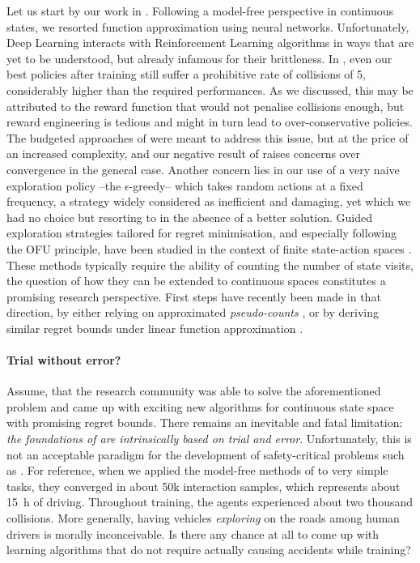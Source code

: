 Let us start by our work in . Following a model-free perspective in continuous states, we resorted function approximation using neural networks. Unfortunately, Deep Learning interacts with Reinforcement Learning algorithms in ways that are yet to be understood, but already infamous for their brittleness. In , even our best policies after training still suffer a prohibitive rate of collisions of \SI{5}{\per}, considerably higher than the required performances. 
As we discussed, this may be attributed to the reward function that would not penalise collisions enough, but reward engineering is tedious and might in turn lead to over-conservative policies. The budgeted approaches of  were meant to address this issue, but at the price of an increased complexity, and our negative result of  raises concerns over convergence in the general case. 
Another concern lies in our use of a very naive exploration policy --the $\epsilon$-greedy-- which takes random actions at a fixed frequency, a strategy widely considered as inefficient and damaging, yet which we had no choice but resorting to in the absence of a better solution. Guided exploration strategies tailored for regret minimisation, and especially following the \gls{OFU} principle, have been studied in the context of finite state-action spaces \citep{Auer2009,Azar2017}. 
These methods typically require the ability of counting the number of state visits, the question of how they can be extended to continuous spaces constitutes a promising research perspective. First steps have recently been made in that direction, by either relying on approximated \emph{pseudo-counts} \citep{Guyon2017}, or by deriving similar regret bounds under linear function approximation \citep{Jin2020}.

\paragraph{Trial without error?}

Assume, that the research community was able to solve the aforementioned problem and came up with exciting new algorithms for continuous state space with promising regret bounds. There remains an inevitable and fatal limitation: \emph{the foundations of  are intrinsically based on trial and error}. Unfortunately, this is not an acceptable paradigm for the development of safety-critical problems such as .
For reference, when we applied the model-free methods of  to very simple tasks, they converged in about 50k interaction samples, which represents about \SI{15}{\hour} of driving. Throughout training, the agents experienced about two thousand collisions. More generally, having vehicles \emph{exploring} on the roads among human drivers is morally inconceivable. Is there any chance at all to come up with learning algorithms that do not require actually causing accidents while training?

